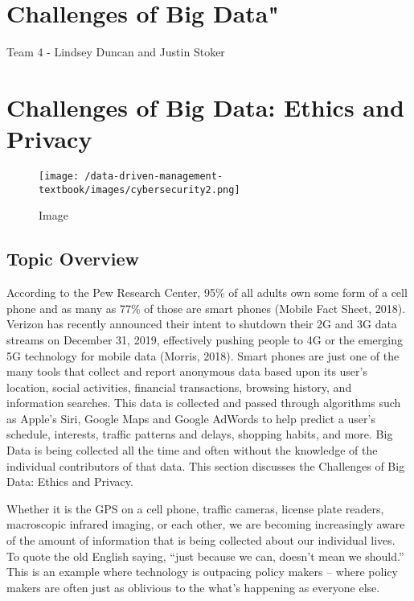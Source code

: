 \documentclass[]{book}
\theoremstyle{definition}
\theoremstyle{definition}
\theoremstyle{definition}
\theoremstyle{remark}
\begin{document}
\hypertarget{challenges-of-big-data}{%
\chapter{Challenges of Big Data"}\label{challenges-of-big-data}}

Team 4 - Lindsey Duncan and Justin Stoker

\hypertarget{challenges-of-big-data-ethics-and-privacy}{%
\chapter{Challenges of Big Data: Ethics and
Privacy}\label{challenges-of-big-data-ethics-and-privacy}}

\begin{figure}
\centering
\texttt{[image: /data-driven-management-textbook/images/cybersecurity2.png]}
\caption{Image}
\end{figure}

\hypertarget{topic-overview-3}{%
\section{Topic Overview}\label{topic-overview-3}}

According to the Pew Research Center, 95\% of all adults own some form
of a cell phone and as many as 77\% of those are smart phones (Mobile
Fact Sheet, 2018). Verizon has recently announced their intent to
shutdown their 2G and 3G data streams on December 31, 2019, effectively
pushing people to 4G or the emerging 5G technology for mobile data
(Morris, 2018). Smart phones are just one of the many tools that collect
and report anonymous data based upon its user's location, social
activities, financial transactions, browsing history, and information
searches. This data is collected and passed through algorithms such as
Apple's Siri, Google Maps and Google AdWords to help predict a user's
schedule, interests, traffic patterns and delays, shopping habits, and
more. Big Data is being collected all the time and often without the
knowledge of the individual contributors of that data. This section
discusses the Challenges of Big Data: Ethics and Privacy.

Whether it is the GPS on a cell phone, traffic cameras, license plate
readers, macroscopic infrared imaging, or each other, we are becoming
increasingly aware of the amount of information that is being collected
about our individual lives. To quote the old English saying, ``just
because we can, doesn't mean we should.'' This is an example where
technology is outpacing policy makers -- where policy makers are often
just as oblivious to the what's happening as everyone else.
\end{document}
